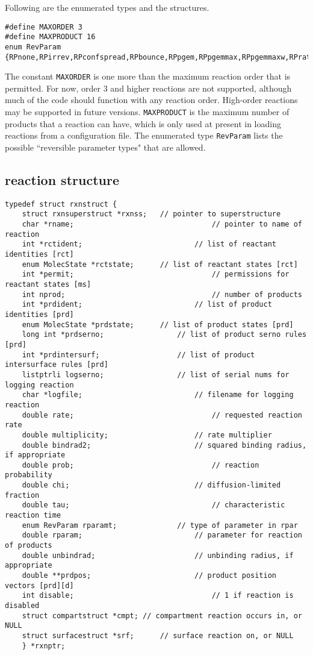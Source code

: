 \documentclass {scrbook}
\newcommand {\ttt} {\texttt}
\begin{document}
Following are the enumerated types and the structures.

\begin{lstlisting}
#define MAXORDER 3
#define MAXPRODUCT 16
enum RevParam {RPnone,RPirrev,RPconfspread,RPbounce,RPpgem,RPpgemmax,RPpgemmaxw,RPratio,RPunbindrad,RPpgem2,RPpgemmax2,RPratio2,RPoffset,RPfixed};
\end{lstlisting}

The constant \ttt{MAXORDER} is one more than the maximum reaction order that is permitted. For now, order 3 and higher reactions are not supported, although much of the code should function with any reaction order. High-order reactions may be supported in future versions. \ttt{MAXPRODUCT} is the maximum number of products that a reaction can have, which is only used at present in loading reactions from a configuration file. The enumerated type \ttt{RevParam} lists the possible ``reversible parameter types" that are allowed.

\subsection*{reaction structure}

\begin{lstlisting}
typedef struct rxnstruct {
	struct rxnsuperstruct *rxnss;	// pointer to superstructure
	char *rname;								// pointer to name of reaction
	int *rctident;							// list of reactant identities [rct]
	enum MolecState *rctstate;		// list of reactant states [rct]
	int *permit;								// permissions for reactant states [ms]
	int nprod;									// number of products
	int *prdident;							// list of product identities [prd]
	enum MolecState *prdstate;		// list of product states [prd]
	long int *prdserno;					// list of product serno rules [prd]
	int *prdintersurf;					// list of product intersurface rules [prd]
	listptrli logserno;					// list of serial nums for logging reaction
	char *logfile;							// filename for logging reaction
	double rate;								// requested reaction rate
	double multiplicity;					// rate multiplier
	double bindrad2;						// squared binding radius, if appropriate
	double prob;								// reaction probability
	double chi;								// diffusion-limited fraction
	double tau;									// characteristic reaction time
	enum RevParam rparamt;				// type of parameter in rpar
	double rparam;							// parameter for reaction of products
	double unbindrad;						// unbinding radius, if appropriate
	double **prdpos;						// product position vectors [prd][d]
	int disable;								// 1 if reaction is disabled
	struct compartstruct *cmpt;	// compartment reaction occurs in, or NULL
	struct surfacestruct *srf;		// surface reaction on, or NULL
	} *rxnptr;
\end{lstlisting}
\end{document}
